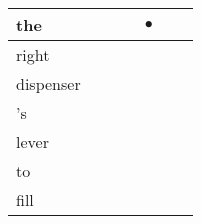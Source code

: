 \documentclass[landscape]{article}
\newcommand{\ssp}{\hspace{2pt}}
\newcommand{\mex}{\cellcolor{g}$\bullet$}
\begin{document}
\begin{tabular}{|l|p{10pt}|p{10pt}|p{10pt}|p{10pt}|p{10pt}|p{10pt}|}
\hline
\ssp \cellcolor{ref3}the \ssp&\hspace{2pt}&\hspace{2pt}&\hspace{2pt}&\hspace{2pt}\mex&\hspace{2pt}&\hspace{2pt}\\
\hline
\ssp right \ssp&\hspace{2pt}&\hspace{2pt}&\hspace{2pt}&\hspace{2pt}&\hspace{2pt}&\hspace{2pt}\\
\hline
\ssp dispenser \ssp&\hspace{2pt}&\hspace{2pt}&\hspace{2pt}&\hspace{2pt}&\hspace{2pt}&\hspace{2pt}\\
\hline
\ssp 's \ssp&\hspace{2pt}&\hspace{2pt}&\hspace{2pt}&\hspace{2pt}&\hspace{2pt}&\hspace{2pt}\\
\hline
\ssp lever \ssp&\hspace{2pt}&\hspace{2pt}&\hspace{2pt}&\hspace{2pt}&\hspace{2pt}&\hspace{2pt}\\
\hline
\ssp to \ssp&\hspace{2pt}&\hspace{2pt}&\hspace{2pt}&\hspace{2pt}&\hspace{2pt}&\hspace{2pt}\\
\hline
\ssp fill \ssp&\hspace{2pt}&\hspace{2pt}&\hspace{2pt}&\hspace{2pt}&\hspace{2pt}&\hspace{2pt}\\

\end{tabular}
\end{document}
